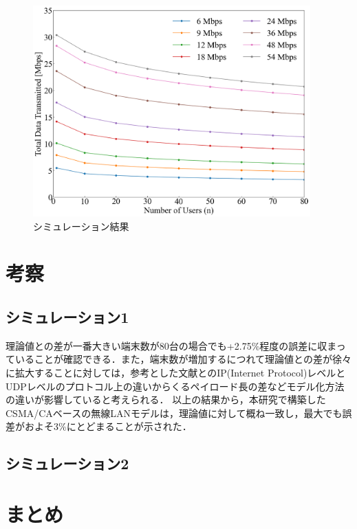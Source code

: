 \documentclass[a4paper,10pt]{ltjsarticle}
\begin{document}
\begin{figure}[H]
  \centering
  \includegraphics[width=0.95\textwidth]{./assets/mcs_index.png}
  \caption{シミュレーション結果}
  \label{fig:simulation-result-mcs-index}
\end{figure}

\clearpage
\section{考察}

\subsection{シミュレーション1}
理論値との差が一番大きい端末数が80台の場合でも+2.75\%程度の誤差に収まっていることが確認できる．また，端末数が増加するにつれて理論値との差が徐々に拡大することに対しては，参考とした文献\cite{paper}とのIP(Internet Protocol)レベルとUDPレベルのプロトコル上の違いからくるペイロード長の差などモデル化方法の違いが影響していると考えられる．
以上の結果から，本研究で構築したCSMA/CAベースの無線LANモデルは，理論値に対して概ね一致し，最大でも誤差がおよそ3\%にとどまることが示された．

\subsection{シミュレーション2}

\clearpage
\section{まとめ}
\end{document}
